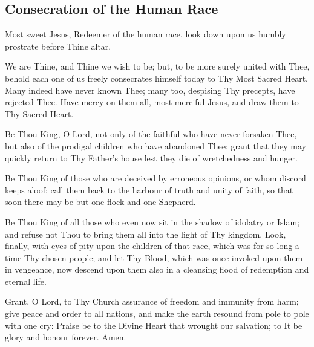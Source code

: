 
\subsection*{Consecration of the Human Race}


Most sweet Jesus, Redeemer of the human race, look down upon us humbly
prostrate before Thine altar. 


We are Thine, and Thine we wish to be;
but, to be more surely united with Thee, behold each one of us freely
consecrates himself today to Thy Most Sacred Heart. Many indeed have
never known Thee; many too, despising Thy precepts, have rejected Thee.
Have mercy on them all, most merciful Jesus, and draw them to Thy
Sacred Heart.

Be Thou %
King, O Lord, not only of the faithful who have never forsaken
Thee, but also of the prodigal children who have abandoned Thee; grant
that they may quickly return to Thy Father's house lest they die of
wretchedness and hunger.

Be Thou King of those who are deceived by erroneous opinions, or whom
discord keeps aloof; call them back to the harbour of truth and unity
of faith, so that soon there may be but one flock and one Shepherd.

Be Thou King of all those who even now
sit in the shadow of
idolatry or Islam; and refuse not Thou to %
bring them all into the light
of Thy kingdom.
Look, finally, with eyes of pity upon the children of
that race, 
which was for so long a time Thy chosen people; and let Thy Blood, 
which was once invoked upon them in vengeance,
now descend upon them  also in a cleansing flood of redemption and eternal life.

Grant, O Lord, to Thy Church assurance of freedom and immunity from
harm; give peace and order to all nations, and make the earth resound
from pole to pole with one cry: Praise be to the Divine Heart that
wrought our salvation; to It be glory and honour forever. Amen.



